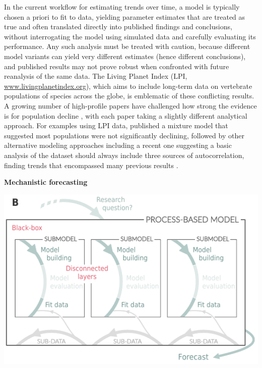 \documentclass[11pt]{article}
\begin{document}
\begin{tcolorbox}
{\begin{multicols}{2}
In the current workflow for estimating trends over time, a model is typically chosen a priori to fit to data, yielding parameter estimates that are treated as true and often translated directly into published findings and conclusions, without interrogating the model using simulated data and carefully evaluating its performance. Any such analysis must be treated with caution, because different model variants can yield very different estimates (hence different conclusions), and published results may not prove robust when confronted with future reanalysis of the same data.
The Living Planet Index (LPI, \url{www.livingplanetindex.org}), which aims to include long-term data on vertebrate populations of species across the globe, is emblematic of these conflicting results. %
A growing number of high-profile papers have challenged how strong the evidence is for population decline \citep{Dornelas2014,gonzalez2016estimating,wagner2021insect,muller2024weather}, with each paper taking a slightly different analytical approach. For examples using LPI data, \citet{Leung2020} published a mixture model that suggested most populations were not significantly declining, followed by other alternative modeling approaches \citep{Buschke2021,puurtinen2022living} including a recent one suggesting a basic analysis of the dataset should always include three sources of autocorrelation, finding trends that encompassed many previous results \citep{Johnson2024}. 


\vfill

\columnbreak

\centerline{\bf Mechanistic forecasting}
\vspace*{2mm}
\begin{minipage}[t]{\linewidth}
    \includegraphics[width=\linewidth]{../figures/forecasting_details}


\end{minipage}
\end{multicols}}
\end{tcolorbox}
\end{document}
